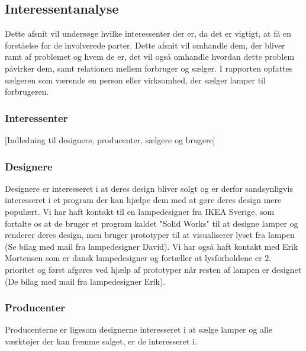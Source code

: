 \subsection{Interessentanalyse}
Dette afsnit vil undersøge hvilke interessenter der er, da det er vigtigt, at få en forståelse for de involverede parter. Dette afsnit vil omhandle dem, der bliver ramt af problemet og hvem de er, det vil også omhandle hvordan dette problem påvirker dem, samt relationen mellem forbruger og sælger. I rapporten opfattes sælgeren som værende en person eller virksomhed, der sælger lamper til forbrugeren. 

\subsubsection{Interessenter}


[Indledning til designere, producenter, sælgere og brugere]


\subsubsection{Designere}
Designere er interesseret i at deres design bliver solgt og er derfor sandsynligvis interesseret i et program der kan hjælpe dem med at gøre deres design mere populært.
Vi har haft kontakt til en lampedesigner fra IKEA Sverige, som fortalte os at de bruger et program kaldet "Solid Works"\cite{SolidWorks} til at designe lamper og renderer deres design, men bruger prototyper til at visualiserer lyset fra lampen (Se bilag med mail fra lampedesigner David).
Vi har også haft kontakt med Erik Mortensen som er dansk lampedesigner og fortæller at lysforholdene er 2. prioritet og først afgøres ved hjælp af prototyper når resten af lampen er designet (De bilag med mail fra lampedesigner Erik).

\subsubsection{Producenter}
Producenterne er ligesom designerne interesseret i at sælge lamper og alle værktøjer der kan fremme salget, er de interesseret i.


